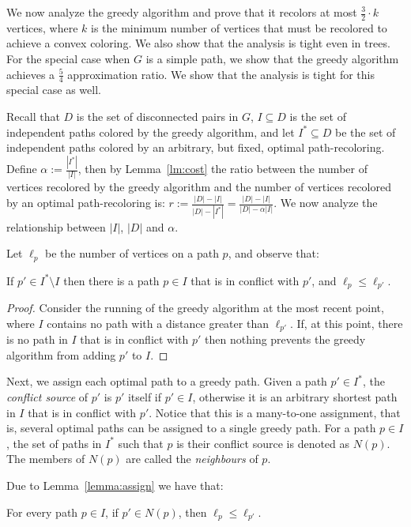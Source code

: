 We now analyze the greedy algorithm and prove that it recolors at most 
$\frac{3}{2} \cdot k$ vertices, 
where $k$ is the minimum number of vertices that must be recolored to achieve a convex
coloring.
%
We also show that the analysis is tight even in trees.
%
For the special case when $G$ is a simple path, 
we show that the greedy algorithm achieves a $\frac{5}{4}$ approximation ratio.
We show that the analysis is tight for this special case as well.

Recall that $D$ is the set of disconnected pairs in $G$, 
$I \subseteq D$ is the set of independent paths colored by the greedy algorithm, 
and let $I^* \subseteq D$ be the set of independent paths colored by an arbitrary, 
but fixed,
optimal path-recoloring.  
%
Define $\alpha := \frac{|I^*|}{|I|}$,
then by Lemma~\ref{lm:cost} the ratio between the number of 
vertices recolored by the greedy algorithm and the number of vertices
recolored by an optimal path-recoloring is:
$
r := \frac{|D| - |I|}{|D| - |I^*|}
= \frac{|D| - |I|}{|D| - \alpha |I|}
$.
We now analyze the relationship between $|I|$, $|D|$ and $\alpha$.

Let $\ell_p$ be the number of vertices on a path $p$, and observe that:

\begin{lemma}
\label{lemma:assign}
If $p' \in I^* \setminus I$ then there is a path $p \in I$ that is in
conflict with $p'$, and $\ell_p \leq \ell_{p'}$.
\end{lemma}
\begin{proof}
Consider the running of the greedy algorithm at the most recent point,
where $I$ contains no path with a distance greater than $\ell_{p'}$.  If,
at this point, there is no path in $I$ that is in conflict with $p'$
then nothing prevents the greedy algorithm from adding $p'$ to $I$.
{}\end{proof}

Next, we assign each optimal path to a greedy path.
%
Given a path $p' \in I^*$, the \emph{conflict source} of $p'$ is $p'$
itself if $p' \in I$, otherwise it is an arbitrary shortest path in
$I$ that is in conflict with $p'$.
%
Notice that this is a many-to-one assignment, that is, several optimal
paths can be assigned to a single greedy path.
%
For a path $p \in I$, the set of paths in $I^*$ such that $p$ is their
conflict source is denoted as $N(p)$.  The members of $N(p)$ are
called the \emph{neighbours} of $p$.

Due to Lemma~\ref{lemma:assign} we have that:

\begin{observation}
\label{co:dpLeqDp'}
For every path $p \in I$, if $p' \in N(p)$, then $\ell_p \leq \ell_{p'}$.
\end{observation}

